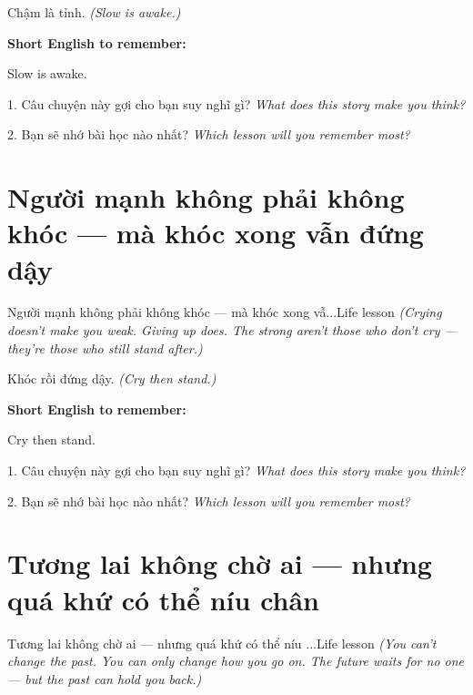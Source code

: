 \begin{baihoc}
Chậm là tỉnh.
\textit{(Slow is awake.)}
\end{baihoc}

\begin{ghinhoanh}
\textbf{Short English to remember:}

Slow is awake.

\end{ghinhoanh}

\begin{tuhocnhanh}
1. Câu chuyện này gợi cho bạn suy nghĩ gì? \textit{What does this story make you think?}

2. Bạn sẽ nhớ bài học nào nhất? \textit{Which lesson will you remember most?}
\end{tuhocnhanh}
\ngancach


\section{Người mạnh không phải không khóc — mà khóc xong vẫn đứng dậy}
\begin{truyen}{Người mạnh không phải không khóc — mà khóc xong vẫ...}{Life lesson}
\textit{(Crying doesn't make you weak. Giving up does. The strong aren't those who don't cry — they're those who still stand after.)}
\end{truyen}

\begin{baihoc}
Khóc rồi đứng dậy.
\textit{(Cry then stand.)}
\end{baihoc}

\begin{ghinhoanh}
\textbf{Short English to remember:}

Cry then stand.

\end{ghinhoanh}

\begin{tuhocnhanh}
1. Câu chuyện này gợi cho bạn suy nghĩ gì? \textit{What does this story make you think?}

2. Bạn sẽ nhớ bài học nào nhất? \textit{Which lesson will you remember most?}
\end{tuhocnhanh}
\ngancach


\section{Tương lai không chờ ai — nhưng quá khứ có thể níu chân}
\begin{truyen}{Tương lai không chờ ai — nhưng quá khứ có thể níu ...}{Life lesson}
\textit{(You can't change the past. You can only change how you go on. The future waits for no one — but the past can hold you back.)}
\end{truyen}

